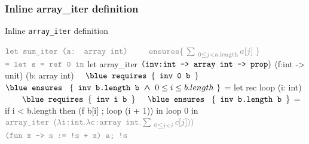 \subsubsection*{Inline array_iter definition}
\begin{frame}[fragile]
{Inline \texttt{array\_iter} definition}
\begin{footnotesize}
\begin{minipage}[t]{0.3\linewidth}

\begin{whycode} 
   $\color{gray}\texttt{let sum\_iter (a: array int)}$
	$\hspace*{2em}\color{gray}\texttt{ensures}\{~\sum_{~0 \leq j < \text{a.length}} a[j]~\}$
   $\color{gray}\texttt{=  let s = ref 0 in}$
      let array_iter  $\color{black}\texttt{(inv:int -> array int -> prop})$ 
      (f:int -> unit) (b: array int)
	      $\Noir{\\ \hspace*{1em}\texttt{\blue requires }\{\texttt{ inv 0 b }\} }$
        $\Noir{\\ \hspace*{0em}\texttt{\blue ensures  }~\{\texttt{ inv b.length b}\bwedge 0 \leq i \leq b.length~\}}$ 
      = let rec loop (i: int)
	      $\Noir{\hspace*{2em}\texttt{\blue requires }\{\texttt{ inv i b }\}}$
        $\Noir{\hspace*{1em}\texttt{\blue ensures  }~\{\texttt{ inv b.length b }\}}$
        = if i < b.length 
          then (f b[i] ; loop (i + 1)) 
        in loop 0   
      in $\color{gray}\texttt{array\_iter }{(\lambda \texttt{i:int}. \lambda \texttt{c:array int}. \sum_{~0\leq j < i} c[j]))}$
                $\color{gray}\texttt{(fun x -> s := !s + x) a;}$
     $\color{gray}\texttt{!s}$
\end{whycode}
\end{minipage}
\end{footnotesize}
\end{frame}
\addtocounter{framenumber}{-1}
